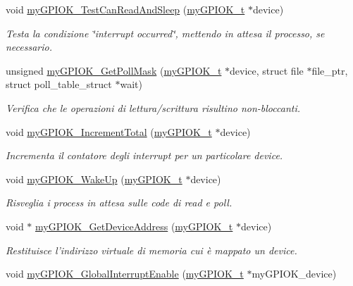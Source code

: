 \begin{DoxyCompactItemize}
void \hyperlink{group__my_g_p_i_o_k__t_gaf1b6f35c097c46361d675a42f122828e}{my\+G\+P\+I\+O\+K\+\_\+\+Test\+Can\+Read\+And\+Sleep} (\hyperlink{structmy_g_p_i_o_k__t}{my\+G\+P\+I\+O\+K\+\_\+t} $\ast$device)
\begin{DoxyCompactList}\small\item\em Testa la condizione \char`\"{}interrupt occurred\char`\"{}, mettendo in attesa il processo, se necessario. \end{DoxyCompactList}\item 
unsigned \hyperlink{group__my_g_p_i_o_k__t_gae428f50a6da69e3cf89348b8ba9401b1}{my\+G\+P\+I\+O\+K\+\_\+\+Get\+Poll\+Mask} (\hyperlink{structmy_g_p_i_o_k__t}{my\+G\+P\+I\+O\+K\+\_\+t} $\ast$device, struct file $\ast$file\+\_\+ptr, struct poll\+\_\+table\+\_\+struct $\ast$wait)
\begin{DoxyCompactList}\small\item\em Verifica che le operazioni di lettura/scrittura risultino non-\/bloccanti. \end{DoxyCompactList}\item 
void \hyperlink{group__my_g_p_i_o_k__t_ga5a7df448de9de94620ce1baf7ec388c9}{my\+G\+P\+I\+O\+K\+\_\+\+Increment\+Total} (\hyperlink{structmy_g_p_i_o_k__t}{my\+G\+P\+I\+O\+K\+\_\+t} $\ast$device)
\begin{DoxyCompactList}\small\item\em Incrementa il contatore degli interrupt per un particolare device. \end{DoxyCompactList}\item 
void \hyperlink{group__my_g_p_i_o_k__t_gae182aa943af08c102a05795ae8526192}{my\+G\+P\+I\+O\+K\+\_\+\+Wake\+Up} (\hyperlink{structmy_g_p_i_o_k__t}{my\+G\+P\+I\+O\+K\+\_\+t} $\ast$device)
\begin{DoxyCompactList}\small\item\em Risveglia i process in attesa sulle code di read e poll. \end{DoxyCompactList}\item 
void $\ast$ \hyperlink{group__my_g_p_i_o_k__t_ga565ffd4946b330b29e1166dfc9851b11}{my\+G\+P\+I\+O\+K\+\_\+\+Get\+Device\+Address} (\hyperlink{structmy_g_p_i_o_k__t}{my\+G\+P\+I\+O\+K\+\_\+t} $\ast$device)
\begin{DoxyCompactList}\small\item\em Restituisce l'indirizzo virtuale di memoria cui è mappato un device. \end{DoxyCompactList}\item 
void \hyperlink{group__my_g_p_i_o_k__t_ga00a24f28b49c71aaa91f66be71a3895b}{my\+G\+P\+I\+O\+K\+\_\+\+Global\+Interrupt\+Enable} (\hyperlink{structmy_g_p_i_o_k__t}{my\+G\+P\+I\+O\+K\+\_\+t} $\ast$my\+G\+P\+I\+O\+K\+\_\+device)

\end{DoxyCompactItemize}

